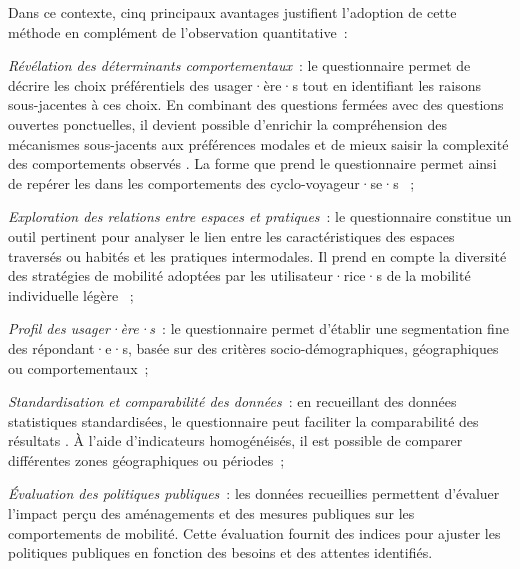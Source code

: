 \begin{refsegment}
Dans ce contexte, cinq principaux avantages justifient l’adoption de cette méthode en complément de l'observation quantitative~:
    \begin{customitemize}
\item \textsl{Révélation des déterminants comportementaux}~: le questionnaire permet de décrire les choix préférentiels des usager·ère·s tout en identifiant les raisons sous-jacentes à ces choix. En combinant des questions fermées avec des questions ouvertes ponctuelles, il devient possible d’enrichir la compréhension des mécanismes sous-jacents aux préférences modales et de mieux saisir la complexité des comportements observés \textcolor{blue}{\autocite[4, 9]{meissonnier_pour_2012}}. La forme que prend le questionnaire permet ainsi de repérer les  dans les comportements des cyclo-voyageur·se·s \textcolor{blue}{\autocite[1~680]{vaisey_motivation_2009}}~;
\item \textsl{Exploration des relations entre espaces et pratiques}~: le questionnaire constitue un outil pertinent pour analyser le lien entre les caractéristiques des espaces traversés ou habités et les pratiques intermodales. Il prend en compte la diversité des stratégies de mobilité adoptées par les utilisateur·rice·s de la mobilité individuelle légère \textcolor{blue}{\autocite[2]{sebille_saisir_2024}}~;
\item \textsl{Profil des usager·ère·s}~: le questionnaire permet d'établir une segmentation fine des répondant·e·s, basée sur des critères socio-démographiques, géographiques ou comportementaux~;
\item \textsl{Standardisation et comparabilité des données}~: en recueillant des données statistiques standardisées, le questionnaire peut faciliter la comparabilité des résultats \textcolor{blue}{\autocite[5]{sebille_saisir_2024}}. À l'aide d'indicateurs homogénéisés,  il est possible de comparer différentes zones géographiques ou périodes~;
\item \textsl{Évaluation des politiques publiques}~: les données recueillies permettent d’évaluer l’impact perçu des aménagements et des mesures publiques sur les comportements de mobilité. Cette évaluation fournit des indices pour ajuster les politiques publiques en fonction des besoins et des attentes identifiés.
    \end{customitemize}%


\end{refsegment}
